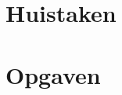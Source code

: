 \documentclass[a4paper,10pt]{article}
\begin{document}
\newpage
\part{Huistaken}



\newpage
\appendix
\part{Opgaven}





%
\end{document}
